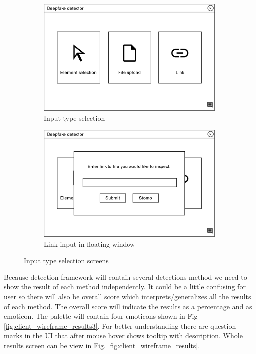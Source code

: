 \begin{figure}[H]
    \begin{subfigure}[h]{.5\linewidth}
        \centering
        \includegraphics[width=1\linewidth]{other-fig/client_wireframe_input_selection.png}
        \caption{Input type selection}
    \end{subfigure}
    \hfill
    \begin{subfigure}[h]{.475\linewidth}
        \centering
        \includegraphics[width=1\linewidth]{other-fig/client_wireframe_input_selection2.png}
        \caption{Link input in floating window}
    \end{subfigure}    
    \caption{Input type selection screens}
    \label{fig:client_wireframe_input_selection}
\end{figure}

Because detection framework will contain several detections method we need to show the result of each method independently. It could be a little confusing for user so there will also be overall score which interprets/generalizes all the results of each method. The overall score will indicate the results as a percentage and as emoticon. The palette will contain four emoticons shown in Fig \ref{fig:client_wireframe_results3}. For better understanding there are question marks in the UI that after mouse hover shows tooltip with description. Whole results screen can be view in Fig. \ref{fig:client_wireframe_results}.

